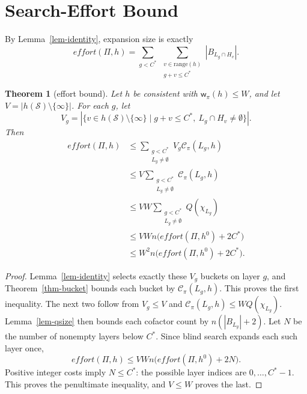 \documentclass[letterpaper]{article}
\newcommand{\task}{\ensuremath{\Pi}}
\newcommand{\states}{\ensuremath{\mathcal{S}}}
\newcommand{\hblind}{\ensuremath{h^{0}}}
\newcommand{\copt}{\ensuremath{C^{*}}}
\newcommand{\bddsize}[1]{\ensuremath{|B_{#1}|}}
\newcommand{\cofcount}{\ensuremath{Q}}
\newcommand{\width}{\ensuremath{\mathsf{w}}}
\newcommand{\cutprod}[2]{\ensuremath{\mathcal{C}_{\pi}(#1,#2)}}
\newcommand{\values}{\ensuremath{V}}
\newcommand{\level}[2]{\ensuremath{H_{#2}}}
\newcommand{\effort}{\ensuremath{\mathit{effort}}}
\newcommand{\hrange}{\ensuremath{\mathrm{range}}}
\theoremstyle{plain}
\newtheorem{theorem}{Theorem}
\theoremstyle{definition}
\theoremstyle{remark}
\begin{document}
\section{Search-Effort Bound}

By Lemma~\ref{lem-identity}, expansion size is exactly
\[
 \effort(\task,h)
 =\sum_{g<\copt}\ \sum_{\substack{v\in\hrange(h)\\g+v\leq\copt}}
   \bddsize{L_g\cap\level{h}{v}}.
\]

\begin{theorem}[effort bound]
\label{thm-effort}
Let $h$ be consistent with $\width_\pi(h)\leq W$, and let
$\values=|h(\states)\setminus\{\infty\}|$.  For each $g$, let
\[
 \values_g=
 |\{v\in h(\states)\setminus\{\infty\}\mid
 g+v\leq\copt,\ L_g\cap\level{h}{v}\ne\emptyset\}|.
\]
Then
\[
 \begin{aligned}
 \effort(\task,h)
 &\leq\sum_{\substack{g<\copt\\L_g\ne\emptyset}}
      \values_g\cutprod{L_g}{h} \\
 &\leq\values
   \sum_{\substack{g<\copt\\L_g\ne\emptyset}}
     \cutprod{L_g}{h} \\
 &\leq\values W
   \sum_{\substack{g<\copt\\L_g\ne\emptyset}}
     \cofcount(\chi_{L_g}) \\
 &\leq\values Wn\bigl(\effort(\task,\hblind)+2\copt\bigr) \\
 &\leq W^2n\bigl(\effort(\task,\hblind)+2\copt\bigr).
 \end{aligned}
\]
\end{theorem}

\begin{proof}
Lemma~\ref{lem-identity} selects exactly these $\values_g$ buckets on layer
$g$, and Theorem~\ref{thm-bucket} bounds each bucket by
$\cutprod{L_g}{h}$. This proves the first inequality.  The next two follow
from $\values_g\leq\values$ and
$\cutprod{L_g}{h}\leq W\cofcount(\chi_{L_g})$.
Lemma~\ref{lem-qsize} then bounds each cofactor count by
$n(\bddsize{L_g}+2)$.
Let $N$ be the number of nonempty layers below $\copt$. Since blind
search expands each such layer once,
\begin{equation}
 \effort(\task,h)
 \leq\values Wn\bigl(\effort(\task,\hblind)+2N\bigr).
 \label{eq-effort-nonempty}
\end{equation}
Positive integer costs imply $N\leq\copt$: the possible layer indices are
$0,\ldots,\copt-1$. This proves the penultimate inequality, and
$\values\leq W$ proves the last.
\end{proof}
\end{document}
